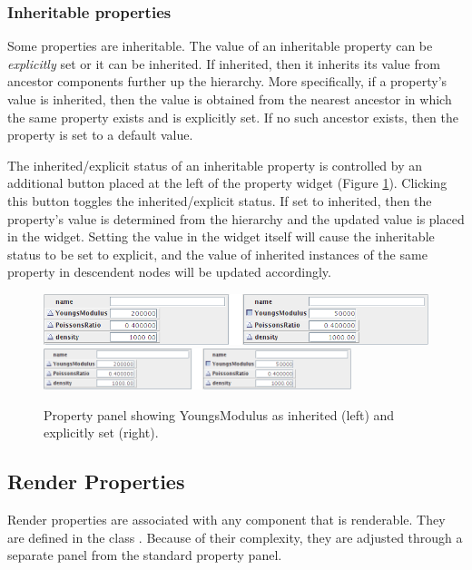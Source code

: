 \documentclass{article}
\begin{document}
\subsubsection{Inheritable properties}

Some properties are inheritable. The value of an inheritable property
can be {\it explicitly} set or it can be inherited.  If inherited, then it
inherits its value from ancestor components further up the hierarchy.
More specifically, if a property's value is inherited, then the value
is obtained from the nearest ancestor in which the same property
exists and is explicitly set.  If no such ancestor exists, then the
property is set to a default value.

The inherited/explicit status of an inheritable property is controlled
by an additional button placed at the left of the property widget
(Figure \ref{inheritedButtonFig}).  Clicking this button toggles the
inherited/explicit status.  If set to inherited, then the property's
value is determined from the hierarchy and the updated value is placed
in the widget.  Setting the value in the widget itself will cause the
inheritable status to be set to explicit, and the value of inherited
instances of the same property in descendent nodes will be updated
accordingly.

\begin{figure}
\begin{center}
\iflatexml
\includegraphics[]{images/inheritedButton}
\else
\includegraphics[width=0.80\textwidth]{images/inheritedButton}
\fi
\end{center}
\caption{Property panel showing YoungsModulus as inherited (left) and explicitly set (right).}%
\label{inheritedButtonFig}
\end{figure}

\subsection{Render Properties}


Render properties are associated with any component that is
renderable. They are defined in the class . 
Because of their complexity, they are adjusted
through a separate panel from the standard property panel.
\end{document}
